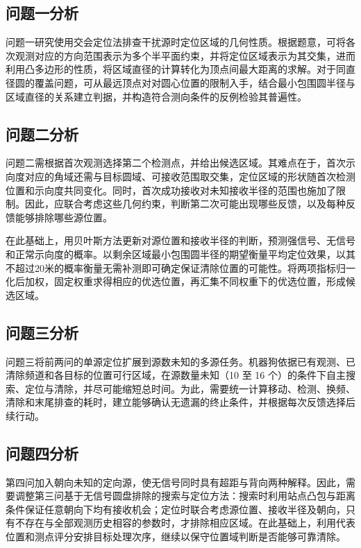 \documentclass[UTF8,a4paper,zihao=-4,fontset=none]{ctexart}
\begin{document}
\subsection{问题一分析}

问题一研究使用交会定位法排查干扰源时定位区域的几何性质。根据题意，可将各次观测对应的方向范围表示为多个半平面约束，并将定位区域表示为其交集，进而利用凸多边形的性质，将区域直径的计算转化为顶点间最大距离的求解。对于同直径圆的覆盖问题，可从最远顶点对对圆心位置的限制入手，结合最小包围圆半径与区域直径的关系建立判据，并构造符合测向条件的反例检验其普遍性。

\subsection{问题二分析}

问题二需根据首次观测选择第二个检测点，并给出候选区域。其难点在于，首次示向度对应的角域还需与目标圆域、可接收范围取交集，定位区域的形状随首次检测位置和示向度共同变化。同时，首次成功接收对未知接收半径的范围也施加了限制。因此，应联合考虑这些几何约束，判断第二次可能出现哪些反馈，以及每种反馈能够排除哪些源位置。

在此基础上，用贝叶斯方法更新对源位置和接收半径的判断，预测强信号、无信号和正常示向度的概率。以剩余区域最小包围圆半径的期望衡量平均定位效果，以其不超过20米的概率衡量无需补测即可确定保证清除位置的可能性。将两项指标归一化后加权，固定权重求得相应的优选位置，再汇集不同权重下的优选位置，形成候选区域。

\subsection{问题三分析}

问题三将前两问的单源定位扩展到源数未知的多源任务。机器狗依据已有观测、已清除频道和各目标的位置可行区域，在源数量未知（10 至 16 个）的条件下自主搜索、定位与清除，并尽可能缩短总时间。为此，需要统一计算移动、检测、换频、清除和末尾排查的耗时，建立能够确认无遗漏的终止条件，并根据每次反馈选择后续行动。

\subsection{问题四分析}

第四问加入朝向未知的定向源，使无信号同时具有超距与背向两种解释。因此，需要调整第三问基于无信号圆盘排除的搜索与定位方法：搜索时利用站点凸包与距离条件保证任意朝向下均有接收机会；定位时联合考虑源位置、接收半径及朝向，只有不存在与全部观测历史相容的参数时，才排除相应区域。在此基础上，利用代表位置和测点评分安排目标处理次序，继续以保守位置域判断是否能够可靠清除。
\end{document}
